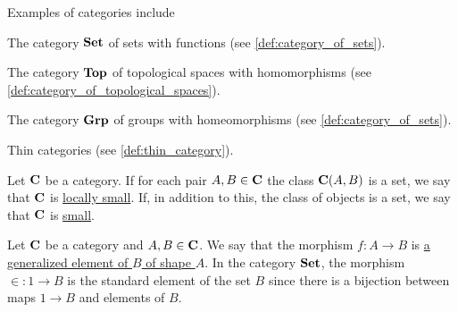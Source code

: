 \begin{example}\label{ex:categories}
  Examples of categories include

  \begin{defenum}
    \item The category $\operatorname{\mathbf{Set}}$ of sets with functions (see \cref{def:category_of_sets}).
    \item The category $\operatorname{\mathbf{Top}}$ of topological spaces with homomorphisms (see \cref{def:category_of_topological_spaces}).
    \item The category $\operatorname{\mathbf{Grp}}$ of groups with homeomorphisms (see \cref{def:category_of_sets}).
    \item Thin categories (see \cref{def:thin_category}).
  \end{defenum}
\end{example}

\begin{definition}\label{def:category_cardinality}
  Let $\operatorname{\mathbf{C}}$ be a category. If for each pair $A, B \in \operatorname{\mathbf{C}}$ the class $\operatorname{\mathbf{C}}(A, B)$ is a set, we say that $\operatorname{\mathbf{C}}$ is \uline{locally small}. If, in addition to this, the class of objects is a set, we say that $\operatorname{\mathbf{C}}$ is \uline{small}.
\end{definition}

\begin{definition}\label{def:generalized_element}\cite[definition 4.1.25]{Leinster2014}
  Let $\operatorname{\mathbf{C}}$ be a category and $A, B \in \operatorname{\mathbf{C}}$. We say that the morphism $f: A \to B$ is \uline{a generalized element of $B$ of shape $A$}. In the category $\operatorname{\mathbf{Set}}$, the morphism $\in : 1 \to B$ is the standard element of the set $B$ since there is a bijection between maps $1 \to B$ and elements of $B$.
\end{definition}

